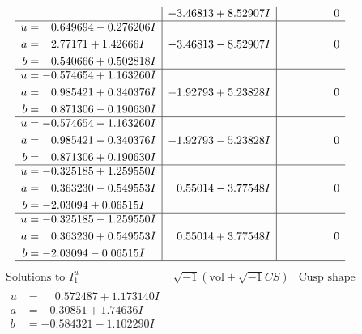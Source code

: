\documentclass[1p]{elsarticle_modified}
\theoremstyle{definition}
\newcommand{\I}{\sqrt{-1}}
\begin{document}
$$\begin{array}{c|c|c}
 & -3.46813 + 8.52907 I & \phantom{-0.000000 } 0 \\ \hline\begin{aligned}
u &= \phantom{-}0.649694 - 0.276206 I \\
a &= \phantom{-}2.77171 + 1.42666 I \\
b &= \phantom{-}0.540666 + 0.502818 I\end{aligned}
 & -3.46813 - 8.52907 I & \phantom{-0.000000 } 0 \\ \hline\begin{aligned}
u &= -0.574654 + 1.163260 I \\
a &= \phantom{-}0.985421 + 0.340376 I \\
b &= \phantom{-}0.871306 - 0.190630 I\end{aligned}
 & -1.92793 + 5.23828 I & \phantom{-0.000000 } 0 \\ \hline\begin{aligned}
u &= -0.574654 - 1.163260 I \\
a &= \phantom{-}0.985421 - 0.340376 I \\
b &= \phantom{-}0.871306 + 0.190630 I\end{aligned}
 & -1.92793 - 5.23828 I & \phantom{-0.000000 } 0 \\ \hline\begin{aligned}
u &= -0.325185 + 1.259550 I \\
a &= \phantom{-}0.363230 - 0.549553 I \\
b &= -2.03094 + 0.06515 I\end{aligned}
 & \phantom{-}0.55014 - 3.77548 I & \phantom{-0.000000 } 0 \\ \hline\begin{aligned}
u &= -0.325185 - 1.259550 I \\
a &= \phantom{-}0.363230 + 0.549553 I \\
b &= -2.03094 - 0.06515 I\end{aligned}
 & \phantom{-}0.55014 + 3.77548 I & \phantom{-0.000000 } 0\\
 \hline 
 \end{array}$$\newpage$$\begin{array}{c|c|c}  
\text{Solutions to }I^u_{1}& \I (\text{vol} + \sqrt{-1}CS) & \text{Cusp shape}\\
 \hline 
\begin{aligned}
u &= \phantom{-}0.572487 + 1.173140 I \\
a &= -0.30851 + 1.74636 I \\
b &= -0.584321 - 1.102290 I\end{aligned}

\end{array}$$
\end{document}

